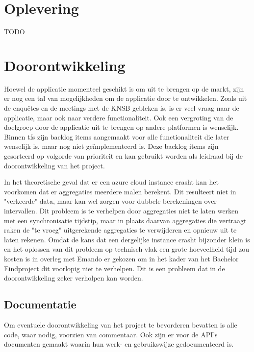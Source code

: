 \section{Oplevering}

{\par \bigskip \par \color{red} TODO \par \bigskip \par }

\section{Doorontwikkeling}
Hoewel de applicatie momenteel geschikt is om uit te brengen op de markt, zijn er nog een tal van mogelijkheden om de applicatie door te ontwikkelen. Zoals uit de enquêtes en de meetings met de \ac{KNSB} gebleken is, is er veel vraag naar de applicatie, maar ook naar verdere functionaliteit. Ook een vergroting van de doelgroep door de applicatie uit te brengen op andere platformen is wenselijk. Binnen \ac{tfs} zijn backlog items aangemaakt voor alle functionaliteit die later wenselijk is, maar nog niet geïmplementeerd is. Deze backlog items zijn gesorteerd op volgorde van prioriteit en kan gebruikt worden als leidraad bij de doorontwikkeling van het project.

In het theoretische geval dat er een azure cloud instance crasht kan het voorkomen dat er aggregaties meerdere malen berekent. Dit resulteert niet in "verkeerde" data, maar kan wel zorgen voor dubbele berekeningen over intervallen. Dit probleem is te verhelpen door aggregaties niet te laten werken met een synchronisatie tijdstip, maar in plaats daarvan aggregaties die vertraagt raken de "te vroeg" uitgerekende aggregaties te verwijderen en opnieuw uit te laten rekenen. Omdat de kans dat een dergelijke instance crasht bijzonder klein is en het oplossen van dit probleem op technisch vlak een grote hoeveelheid tijd zou kosten is in overleg met Emando er gekozen om in het kader van het Bachelor Eindproject dit voorlopig niet te verhelpen. Dit is een probleem dat in de doorontwikkeling zeker verholpen kan worden.

\subsection{Documentatie}
Om eventuele doorontwikkeling van het project te bevorderen bevatten is alle code, waar nodig, voorzien van commentaar. Ook zijn er voor de API's documenten gemaakt waarin hun werk- en gebruikswijze gedocumenteerd is. 

